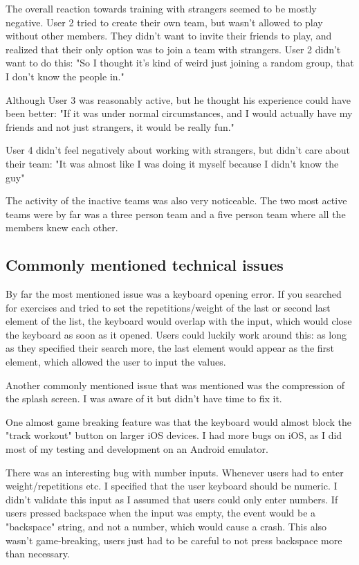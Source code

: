 \documentclass{l4proj}
\begin{document}
The overall reaction towards training with strangers seemed to be mostly negative. User 2 tried to create their own team, but wasn't allowed to play without other members. They didn't want to invite their friends to play, and realized that their only option was to join a team with strangers. User 2 didn't want to do this: "So I thought it's kind of weird just joining a random group, that I don't know the people in." 

Although User 3 was reasonably active, but he thought his experience could have been better: "If it was under normal circumstances, and I would actually have my friends and not just strangers, it would be really fun." 

User 4 didn't feel negatively about working with strangers, but didn't care about their team: "It was almost like I was doing it myself because I didn't know the guy" 

The activity of the inactive teams was also very noticeable. The two most active teams were by far was a three person team and a five person team where all the members knew each other. 

  


\subsection{Commonly mentioned technical issues}
By far the most mentioned issue was a keyboard opening error. If you searched for exercises and tried to set the repetitions/weight of the last or second last element of the list, the keyboard would overlap with the input, which would close the keyboard as soon as it opened. Users could luckily work around this: as long as they specified their search more, the last element would appear as the first element, which allowed the user to input the values.

Another commonly mentioned issue that was mentioned was the compression of the splash screen. I was aware of it but didn't have time to fix it. 

One almost game breaking feature was that the keyboard would almost block the "track workout" button on larger iOS devices. I had more bugs on iOS, as I did most of my testing and development on an Android emulator.

There was an interesting bug with number inputs. Whenever users had to enter weight/repetitions etc. I specified that the user keyboard should be numeric. I didn't validate this input as I assumed that users could only enter numbers. If users pressed backspace when the input was empty, the event would be a "backspace" string, and not a number, which would cause a crash. This also wasn't game-breaking, users just had to be careful to not press backspace more than necessary.
\end{document}
